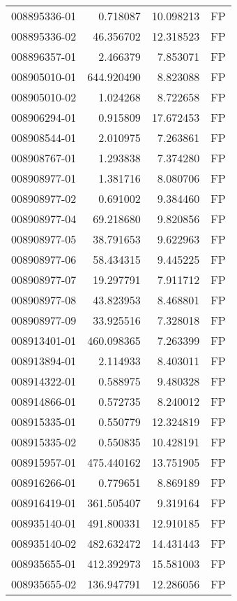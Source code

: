 \begin{tabular}{lrrl}
008895336-01 &    0.718087 &    10.098213 &   FP \\
008895336-02 &   46.356702 &    12.318523 &   FP \\
008896357-01 &    2.466379 &     7.853071 &   FP \\
008905010-01 &  644.920490 &     8.823088 &   FP \\
008905010-02 &    1.024268 &     8.722658 &   FP \\
008906294-01 &    0.915809 &    17.672453 &   FP \\
008908544-01 &    2.010975 &     7.263861 &   FP \\
008908767-01 &    1.293838 &     7.374280 &   FP \\
008908977-01 &    1.381716 &     8.080706 &   FP \\
008908977-02 &    0.691002 &     9.384460 &   FP \\
008908977-04 &   69.218680 &     9.820856 &   FP \\
008908977-05 &   38.791653 &     9.622963 &   FP \\
008908977-06 &   58.434315 &     9.445225 &   FP \\
008908977-07 &   19.297791 &     7.911712 &   FP \\
008908977-08 &   43.823953 &     8.468801 &   FP \\
008908977-09 &   33.925516 &     7.328018 &   FP \\
008913401-01 &  460.098365 &     7.263399 &   FP \\
008913894-01 &    2.114933 &     8.403011 &   FP \\
008914322-01 &    0.588975 &     9.480328 &   FP \\
008914866-01 &    0.572735 &     8.240012 &   FP \\
008915335-01 &    0.550779 &    12.324819 &   FP \\
008915335-02 &    0.550835 &    10.428191 &   FP \\
008915957-01 &  475.440162 &    13.751905 &   FP \\
008916266-01 &    0.779651 &     8.869189 &   FP \\
008916419-01 &  361.505407 &     9.319164 &   FP \\
008935140-01 &  491.800331 &    12.910185 &   FP \\
008935140-02 &  482.632472 &    14.431443 &   FP \\
008935655-01 &  412.392973 &    15.581003 &   FP \\
008935655-02 &  136.947791 &    12.286056 &   FP \\

\end{tabular}
